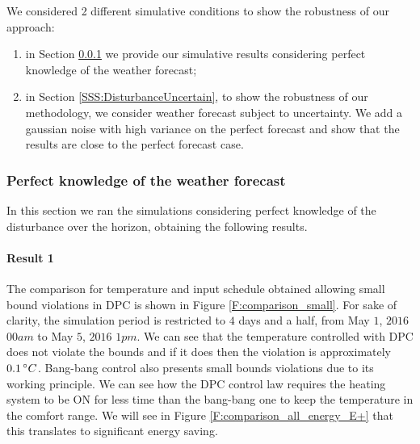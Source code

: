 \textcolor[rgb]{0,0,1}{We considered 2 different simulative conditions to show the robustness of our approach:
\begin{enumerate}
	\item in Section \ref{SSS:DisturbancePerfect} we provide our simulative results considering perfect knowledge of the weather forecast;
	\item in Section \ref{SSS:DisturbanceUncertain}, to show the robustness of our methodology, we consider weather forecast subject to uncertainty. We add a gaussian noise with high variance on the perfect forecast and show that the results are close to the perfect forecast case.
\end{enumerate}
\subsubsection{Perfect knowledge of the weather forecast}\label{SSS:DisturbancePerfect}
In this section we ran the simulations considering perfect knowledge of the disturbance over the horizon, obtaining the following results.}
\paragraph{Result 1} The comparison for temperature and input schedule obtained allowing small bound violations in DPC is shown in Figure \ref{F:comparison_small}. For sake of clarity, the simulation period is restricted to $4$ days and a half, from May $1$, $2016$ $00am$ to May $5$, $2016$ $1pm$. We can see that the temperature controlled with DPC does not violate the bounds and if it does then the violation is approximately $0.1\,\degree C$. Bang-bang control also presents small bounds violations due to its working principle. We can see how the DPC control law requires the heating system to be ON for less time than the bang-bang one to keep the temperature in the comfort range. 
We will see in Figure \ref{F:comparison_all_energy_E+} that this translates to significant energy saving.

